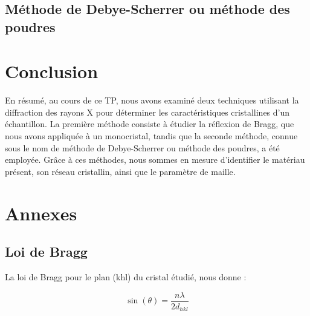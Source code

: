 \documentclass[12pt,a4paper]{article}
\begin{document}


\newpage










\subsection{Méthode de Debye-Scherrer ou méthode des poudres}
\vspace{0.2cm}



\newpage









\section{Conclusion}	

En résumé, au cours de ce TP, nous avons examiné deux techniques utilisant la diffraction des rayons X pour déterminer les caractéristiques cristallines d'un échantillon. La première méthode consiste à étudier la réflexion de Bragg, que nous avons appliquée à un monocristal, tandis que la seconde méthode, connue sous le nom de méthode de Debye-Scherrer ou méthode des poudres, a été employée. Grâce à ces méthodes, nous sommes en mesure d'identifier le matériau présent, son réseau cristallin, ainsi que le paramètre de maille.






\newpage 
\section{Annexes}
\subsection{Loi de Bragg}

La loi de Bragg pour le plan (khl) du cristal étudié, nous donne :

\begin{equation} \label{eq:Loi_de_Bragg}
	\sin (\theta ) = \frac{n \lambda }{2 d_{hkl}}
\end{equation}
\end{document}
